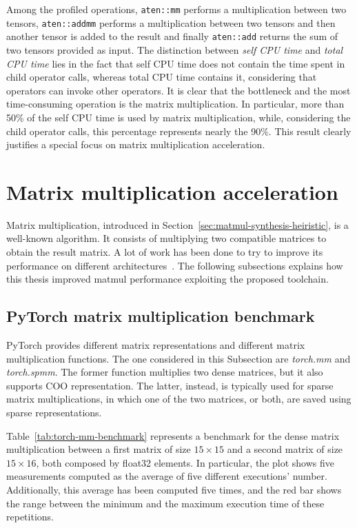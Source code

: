 Among the profiled operations, \lstinline{aten::mm} performs a multiplication between two tensors, \lstinline{aten::addmm} performs a multiplication between two tensors and then another tensor is added to the result and finally \lstinline{aten::add} returns the sum of two tensors provided as input.
The distinction between \textit{self CPU time} and \textit{total CPU time} lies in the fact that self CPU time does not contain the time spent in child operator calls, whereas total CPU time contains it, considering that operators can invoke other operators.
It is clear that the bottleneck and the most time-consuming operation is the matrix multiplication.
In particular, more than 50\% of the self CPU time is used by matrix multiplication, while, considering the child operator calls, this percentage represents nearly the 90\%.
This result clearly justifies a special focus on matrix multiplication acceleration.

\section{Matrix multiplication acceleration}
\label{sec:matmul-acceleration}%

Matrix multiplication, introduced in Section~\ref{sec:matmul-synthesis-heiristic}, is a well-known algorithm.
It consists of multiplying two compatible matrices to obtain the result matrix.
A lot of work has been done to try to improve its performance on different architectures~\cite{DBLP:journals/corr/abs-2003-00532, opt_cuda_matmul}.
The following subsections explains how this thesis improved matmul performance exploiting the proposed toolchain.

\subsection{PyTorch matrix multiplication benchmark}
\label{subsec:pytorch-matmul-bench}%

PyTorch provides different matrix representations and different matrix multiplication functions.
The one considered in this Subsection are \textit{torch.mm} and \textit{torch.spmm}.
The former function multiplies two dense matrices, but it also supports COO representation.
The latter, instead, is typically used for sparse matrix multiplications, in which one of the two matrices, or both, are saved using sparse representations.

Table~\ref{tab:torch-mm-benchmark} represents a benchmark for the dense matrix multiplication between a first matrix of size $15 \times 15$ and a second matrix of size $15 \times 16$, both composed by float32 elements.
In particular, the plot shows five measurements computed as the average of five different executions' number.
Additionally, this average has been computed five times, and the red bar shows the range between the minimum and the maximum execution time of these repetitions.

